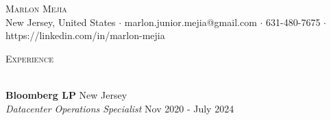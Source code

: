 \documentclass[a4paper]{article}
\newcommand{\lineunder} {
    \vspace*{-8pt} \\
    \hspace*{-18pt} \hrulefill \\
}
\newcommand{\header} [1] {
    {\hspace*{-18pt}\vspace*{6pt} \textsc{#1}}
    \vspace*{-6pt} \lineunder
}
\begin{document}
\vspace*{-40pt}

    

\vspace*{-10pt}
\begin{center}
	{\Huge \scshape {Marlon Mejia}}\\
	New Jersey, United States $\cdot$ marlon.junior.mejia@gmail.com $\cdot$ 631-480-7675 $\cdot$ https://linkedin.com/in/marlon-mejia\\
\end{center}

\header{Experience}
\vspace{1mm}

\textbf{Bloomberg LP} \hfill New Jersey\\
\textit{Datacenter Operations Specialist} \hfill Nov 2020 - July 2024\\
\vspace{-1mm}
\end{document}
